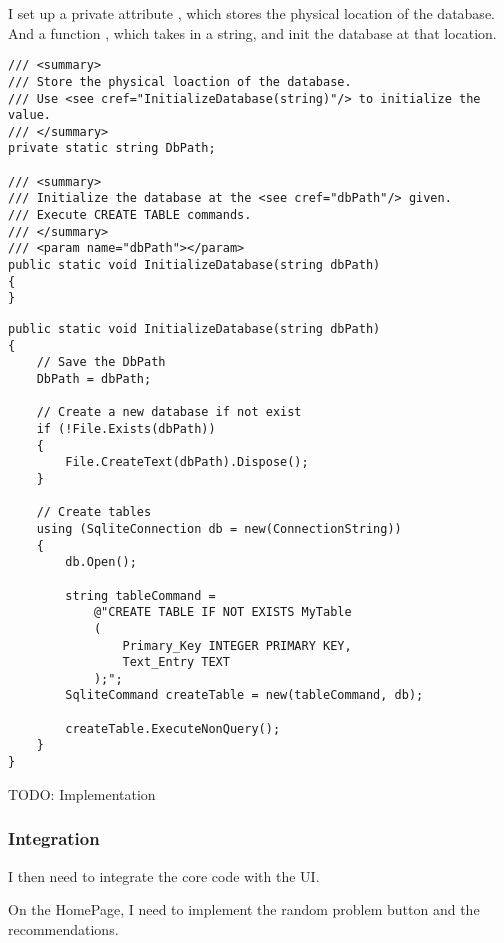 \documentclass[report.tex]{subfiles}
\begin{document}
I set up a private attribute , which stores the physical location of the database. And a function , which takes in a string, and init the database at that location.

\begin{verbatim}
/// <summary>
/// Store the physical loaction of the database.
/// Use <see cref="InitializeDatabase(string)"/> to initialize the value.
/// </summary>
private static string DbPath;

/// <summary>
/// Initialize the database at the <see cref="dbPath"/> given.
/// Execute CREATE TABLE commands.
/// </summary>
/// <param name="dbPath"></param>
public static void InitializeDatabase(string dbPath)
{
}
\end{verbatim}

\begin{verbatim}
public static void InitializeDatabase(string dbPath)
{
    // Save the DbPath
    DbPath = dbPath;

    // Create a new database if not exist
    if (!File.Exists(dbPath))
    {
        File.CreateText(dbPath).Dispose();
    }

    // Create tables
    using (SqliteConnection db = new(ConnectionString))
    {
        db.Open();

        string tableCommand =
            @"CREATE TABLE IF NOT EXISTS MyTable 
            (
                Primary_Key INTEGER PRIMARY KEY,
                Text_Entry TEXT
            );";
        SqliteCommand createTable = new(tableCommand, db);

        createTable.ExecuteNonQuery();
    }
}
\end{verbatim}

TODO: Implementation

\subsubsection{Integration}

I then need to integrate the core code with the UI.

On the HomePage, I need to implement the random problem button and the recommendations.
\end{document}
